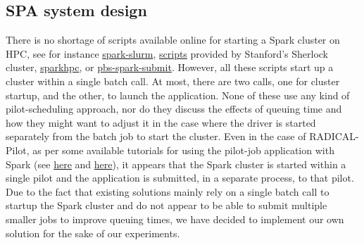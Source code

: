	\subsection{SPA system design}
    
	There is no shortage of scripts available online for starting a Spark cluster on HPC, 
	see for instance \href{https://github.com/NIH-HPC/spark-slurm}{spark-slurm},
	\href{https://www.sherlock.stanford.edu/docs/software/using/spark}{scripts} provided
	 by Stanford's Sherlock cluster, \href{https://sparkhpc.readthedocs.io}{sparkhpc},
	 or \href{https://www.osc.edu/~troy/pbstools/man/pbs-spark-submit}{pbs-spark-submit}.
	However, all these scripts start up a cluster within a single batch call. At most, there are two calls, one for
	cluster startup,
	and the other, to launch the application. None of these use any kind of pilot-scheduling approach, nor do they discuss the
	effects of queuing time and how they might want to adjust it in the
	case where the driver is started separately from the batch job to start
	the cluster. Even in the case of RADICAL-Pilot, as per some available
	tutorials for using the pilot-job application with
	Spark (see
	\href{https://github.com/radical-cybertools/pilot-streaming/blob/master/examples/Pilot-Streaming-GettingStarted.ipynb}{here}
	and \href{https://github.com/radical-cybertools/MIDAS-tutorial/blob/master/pilot/Pilot-Spark.ipynb}{here}),
	it appears that the Spark cluster is started within a single pilot and
	the application is submitted, in a separate process, to that pilot. Due
	to the fact that existing solutions mainly rely on a single batch call
	to startup the Spark cluster and do not appear to be able to submit
	multiple smaller jobs to improve queuing times, we have decided to
	implement our own solution for the sake of our experiments.
    
